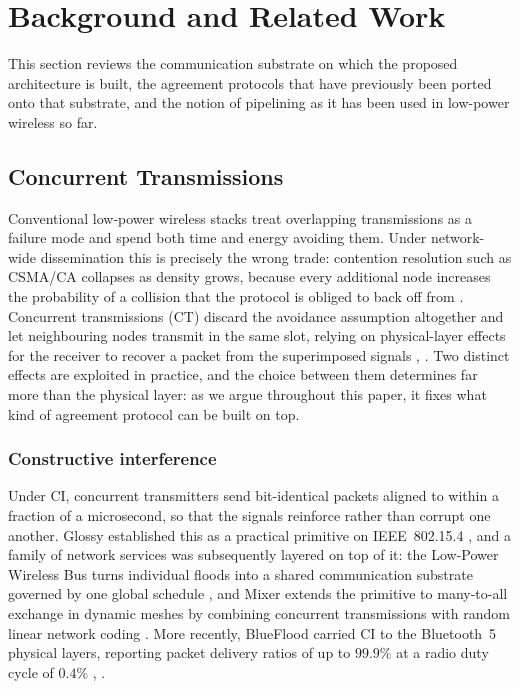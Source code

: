 \documentclass[journal]{IEEEtran}
\newcommand{\CI}{CI}                      %
\begin{document}

\section{Background and Related Work}
\label{sec:back}
This section reviews the communication substrate on which the proposed
architecture is built, the agreement protocols that have previously been
ported onto that substrate, and the notion of pipelining as it has been
used in low-power wireless so far.

\subsection{Concurrent Transmissions}
\label{sec:back-ct}

Conventional low-power wireless stacks treat overlapping transmissions as
a failure mode and spend both time and energy avoiding them. Under
network-wide dissemination this is precisely the wrong trade: contention
resolution such as CSMA/CA collapses as density grows, because every
additional node increases the probability of a collision that the protocol
is obliged to back off from \cite{zimmerling20survey}. Concurrent
transmissions (CT) discard the avoidance assumption altogether and let
neighbouring nodes transmit in the same slot, relying on physical-layer
effects for the receiver to recover a packet from the superimposed signals
\cite{zimmerling20survey}, \cite{wilhelm14reception}. Two distinct effects
are exploited in practice, and the choice between them determines far more
than the physical layer: as we argue throughout this paper, it fixes what
kind of agreement protocol can be built on top.

\subsubsection{Constructive interference}
Under \CI, concurrent transmitters send bit-identical packets aligned to
within a fraction of a microsecond, so that the signals reinforce rather
than corrupt one another. Glossy established this as a practical primitive
on IEEE~802.15.4 \cite{ferrari11glossy}, and a family of network services
was subsequently layered on top of it: the Low-Power Wireless Bus turns
individual floods into a shared communication substrate governed by one
global schedule \cite{ferrari12lwb}, and Mixer extends the primitive to
many-to-all exchange in dynamic meshes by combining concurrent
transmissions with random linear network coding \cite{herrmann18mixer}.
More recently, BlueFlood carried \CI{} to the Bluetooth~5 physical layers,
reporting packet delivery ratios of up to $99.9\%$ at a radio duty cycle
of $0.4\%$ \cite{alnahas19blueflood}, \cite{alnahas21blueflood}.
\end{document}
